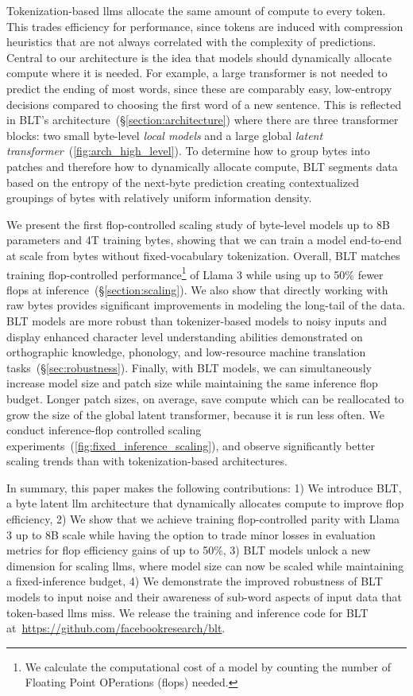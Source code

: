 Tokenization-based llms allocate the same amount of compute to every token. This trades efficiency for performance, since tokens are induced with compression heuristics that are not always correlated with the complexity of predictions. Central to our architecture is the idea that models should dynamically allocate compute where it is needed. For example, a large transformer is not needed to predict the ending of most words, since these are comparably easy, low-entropy decisions compared to choosing the first word of a new sentence. This is reflected in {\textsc BLT}'s architecture~(\S\ref{section:architecture}) where there are three transformer blocks: two small byte-level \textit{local models} and a large global \textit{latent transformer}~(\autoref{fig:arch_high_level}).
To determine how to group bytes into patches and therefore how to dynamically allocate compute, {\textsc BLT} segments data based on the entropy of the next-byte prediction creating contextualized groupings of bytes with relatively uniform information density.

We present the first flop-controlled scaling study of byte-level models up to 8B parameters and 4T training bytes, showing that we can train a model end-to-end at scale from bytes without fixed-vocabulary tokenization. Overall, {\textsc BLT} matches training flop-controlled performance\footnote{We calculate the computational cost of a model by counting the number of Floating Point OPerations (flops) needed.} of Llama 3 while using up to 50\% fewer flops at inference~(\S\ref{section:scaling}).
We also show that directly working with raw bytes provides significant improvements in modeling the long-tail of the data. {\textsc BLT} models are more robust than tokenizer-based models to noisy inputs and display enhanced character level understanding abilities demonstrated on orthographic knowledge, phonology, and low-resource machine translation tasks~(\S\ref{sec:robustness}).
Finally, with {\textsc BLT} models, we can simultaneously increase model size and patch size  while maintaining the same inference flop budget. Longer patch sizes, on average, save compute which can be reallocated to grow the size of the global latent transformer, because it is run less often. We conduct inference-flop controlled scaling experiments~(\autoref{fig:fixed_inference_scaling}), and observe significantly better scaling trends than with tokenization-based architectures. 

In summary, this paper makes the following contributions: 1) We introduce {\textsc BLT}, a byte latent llm architecture that dynamically allocates compute to improve flop efficiency, 2) We show that we achieve training flop-controlled parity with Llama 3 up to 8B scale while having the option to trade minor losses in evaluation metrics for flop efficiency gains of up to 50\%, 3) {\textsc BLT} models unlock a new dimension for scaling llms, where model size can now be scaled while maintaining a fixed-inference budget, 4) We demonstrate the improved robustness of {\textsc BLT} models to input noise and their awareness of sub-word aspects of input data that token-based llms miss. We release the training and inference code for {\textsc BLT}  at~\url{https://github.com/facebookresearch/blt}.

